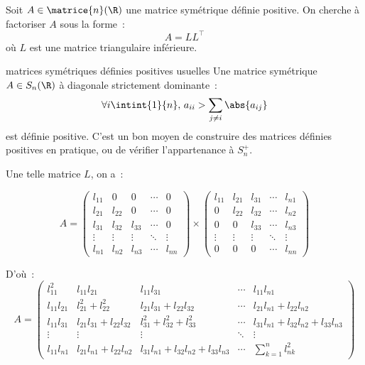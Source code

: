 
Soit $A \in \matrice{n}(\R)$ une matrice symétrique définie positive. On cherche à factoriser $A$ sous la forme~:
$$A = LL^\top$$
où $L$ est une matrice triangulaire inférieure.\\

\begin{remarque}{}{matrices symétriques définies positives usuelles}
    Une matrice symétrique $A \in S_n(\R)$ à diagonale strictement dominante~:
    $$\forall i \intint{1}{n},\, a_{ii} > \sum_{j \neq i} \abs{a_{ij}}$$
    est définie positive. C'est un bon moyen de construire des matrices définies positives en pratique, ou de vérifier l'appartenance à $S_n^+$.
\end{remarque}

Une telle matrice $L$, on a~:

$$A = \begin{pmatrix}
    l_{11} & 0 & 0 & \cdots & 0\\
    l_{21} & l_{22} & 0 & \cdots & 0\\
    l_{31} & l_{32} & l_{33} & \cdots & 0\\
    \vdots & \vdots & \vdots & \ddots & \vdots\\
    l_{n1} & l_{n2} & l_{n3} & \cdots & l_{nn}
\end{pmatrix}\times \begin{pmatrix}
    l_{11} & l_{21} & l_{31} & \cdots & l_{n1}\\
    0 & l_{22} & l_{32} & \cdots & l_{n2}\\
    0 & 0 & l_{33} & \cdots & l_{n3}\\
    \vdots & \vdots & \vdots & \ddots & \vdots\\
    0 & 0 & 0 & \cdots & l_{nn}
\end{pmatrix}$$

D'où~:
$$A = \begin{pmatrix}
    l_{11}^2 & l_{11}l_{21} & l_{11}l_{31} & \cdots & l_{11}l_{n1}\\
    l_{11}l_{21} & l_{21}^2 + l_{22}^2 & l_{21}l_{31} + l_{22}l_{32} & \cdots & l_{21}l_{n1} + l_{22}l_{n2}\\
    l_{11}l_{31} & l_{21}l_{31} + l_{22}l_{32} & l_{31}^2 + l_{32}^2 + l_{33}^2 & \cdots & l_{31}l_{n1} + l_{32}l_{n2} + l_{33}l_{n3}\\
    \vdots & \vdots & \vdots & \ddots & \vdots\\
    l_{11}l_{n1} & l_{21}l_{n1} + l_{22}l_{n2} & l_{31}l_{n1} + l_{32}l_{n2} + l_{33}l_{n3} & \cdots & \sum_{k=1}^n l_{nk}^2
\end{pmatrix}$$

